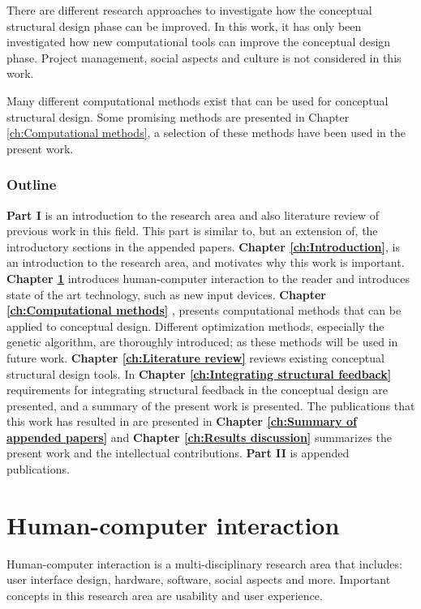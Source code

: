 There are different research approaches to investigate how the conceptual structural design phase can be improved. In this work, it has only been investigated how new computational tools can improve the conceptual design phase. Project management, social aspects and culture is not considered in this work.

Many different computational methods exist that can be used for conceptual structural design. Some promising methods are presented in Chapter \ref{ch:Computational methods}, a selection of these methods have been used in the present work.

\subsection{Outline}
\textbf{Part I} is an introduction to the research area and also literature review of previous work in this field. This part is similar to, but an extension of, the introductory sections in the appended papers. \textbf{Chapter \ref{ch:Introduction}}, is an introduction to the research area, and motivates why this work is important. \textbf{Chapter \ref{ch:Human-computer interaction}} introduces human-computer interaction to the reader and introduces state of the art technology, such as new input devices. \textbf{Chapter \ref{ch:Computational methods}} , presents computational methods that can be applied to conceptual design. Different optimization methods, especially the genetic algorithm, are thoroughly introduced; as these methods will be used in future work. \textbf{Chapter \ref{ch:Literature review}} reviews existing conceptual structural design tools. In \textbf{Chapter \ref{ch:Integrating structural feedback}} requirements for integrating structural feedback in the conceptual design are presented, and a summary of the present work is presented. The publications that this work has resulted in are presented in \textbf{Chapter \ref{ch:Summary of appended papers}} and \textbf{Chapter \ref{ch:Results discussion}} summarizes the present work and the intellectual contributions. \textbf{Part II}  is appended publications.






\chapter{Human-computer interaction}
\label{ch:Human-computer interaction}
Human-computer interaction is a multi-disciplinary research area that includes: user interface design, hardware, software, social aspects and more. Important concepts in this research area are usability and user experience.

